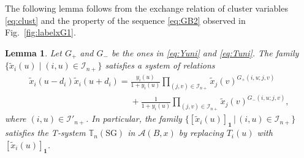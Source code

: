 \documentclass[11pt]{article}
\numberwithin{equation}{section}
\newtheorem{Lemma}[Theorem]{Lemma}
\theoremstyle{definition}
\begin{document}
The following lemma follows from the exchange relation
of
cluster variables \eqref{eq:clust}
and the property of the sequence \eqref{eq:GB2}
 observed in Fig.~\ref{fig:labelxG1}.

\begin{Lemma}
\label{lem:Gx2}
Let $G_+$ and $G_-$ be the ones in \eqref{eq:Yuni} and \eqref{eq:Tuni}.
The family $\{\tilde{x}_i(u)
\mid (i,u)\in \mathcal{I}_{n+}\}$
satisfies a system of relations
\begin{gather}
\tilde{x}_i\left(u-d_i\right)
\tilde{x}_i\left(u+d_i\right)
 =
\frac{y_i(u)}{1+y_i(u)}
\prod_{(j,v)\in \mathcal{I}_{n+}}
\tilde{x}_j(v)^{G_+(i,u;j,v)}
\nonumber\\
\phantom{\tilde{x}_i\left(u-d_i\right)
\tilde{x}_i\left(u+d_i\right)
 =}{}
+
\frac{1}{1+y_i(u)}
\prod_{(j,v)\in \mathcal{I}_{n+}}
\tilde{x}_j(v)^{G_-(i,u;j,v)},\label{eq:xy1}
\end{gather}
where $(i,u)\in \mathcal{I}'_{n+}$.
In particular,
the family $\{ [\tilde{x}_i(u)]_{\mathbf{1}}
\,|\, (i,u)\in \mathcal{I}_{n+}\}$
satisfies the T-system $\mathbb{T}_{n}(\mathrm{SG})$
in $\mathcal{A}(B,x)$
by replacing $T_i(u)$ with $[\tilde{x}_i(u)]_{\mathbf{1}}$.
\end{Lemma}
\end{document}
